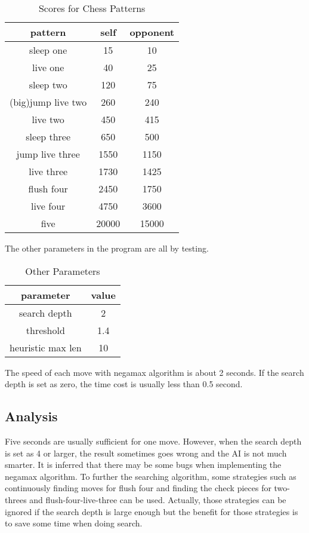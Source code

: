 \documentclass[9pt,shortpaper,twoside,web]{ieeecolor}
\begin{document}
\begin{table}[ht]
\caption{Scores for Chess Patterns}
\centering
\begin{tabular}{ccc}
\hline
\textbf{pattern}   & \textbf{self} & \textbf{opponent} \\ \hline
sleep one          & 15            & 10                \\
live one           & 40            & 25                \\
sleep two          & 120           & 75                \\
(big)jump live two & 260           & 240               \\
live two           & 450           & 415               \\
sleep three        & 650           & 500               \\
jump live three    & 1550          & 1150              \\
live three         & 1730          & 1425              \\
flush four         & 2450          & 1750              \\
live four          & 4750          & 3600              \\
five               & 20000         & 15000             \\ \hline
\end{tabular}
\end{table}

The other parameters in the program are all by testing. 

\begin{table}[ht]
\caption{Other Parameters}
\centering
\begin{tabular}{cc}
\hline
\textbf{parameter} & \textbf{value} \\ \hline
search depth       & 2              \\
threshold          & 1.4            \\
heuristic max len  & 10             \\ \hline
\end{tabular}
\end{table}

The speed of each move with negamax algorithm is about 2 seconds. If the search depth is set as zero, the time cost is usually less than 0.5 second.


\subsection{Analysis}
Five seconds are usually sufficient for one move. However, when the search depth is set as 4 or larger, the result sometimes goes wrong and the AI is not much smarter. It is inferred that there may be some bugs when implementing the negamax algorithm. 
To further the searching algorithm, some strategies such as continuously finding moves for flush four and finding the check pieces for two-threes and flush-four-live-three can be used. Actually, those strategies can be ignored if the search depth is large enough but the benefit for those strategies is to save some time when doing search. 
\end{document}

